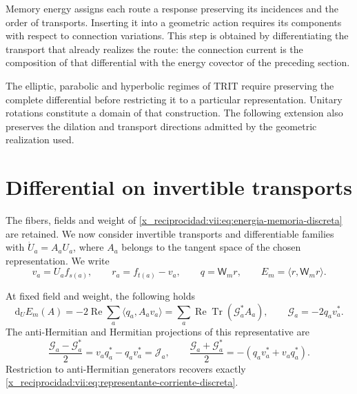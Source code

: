 Memory energy assigns each route a response preserving its
incidences and the order of transports. Inserting it into a geometric
action requires its components with respect to connection
variations. This step is obtained by differentiating the transport that already realizes
the route: the connection current is the composition of that differential
with the energy covector of the preceding section.

The elliptic, parabolic and hyperbolic regimes of TRIT require
preserving the complete differential before restricting it to a
particular representation. Unitary rotations constitute a
domain of that construction. The following extension also preserves
the dilation and transport directions admitted by the geometric
realization used.

\section{Differential on invertible transports}

The fibers, fields and weight of
\eqref{x_reciprocidad:vii:eq:energia-memoria-discreta} are retained. We now consider invertible
transports and differentiable families with
\(\dot U_a=A_aU_a\), where \(A_a\) belongs to the tangent space
of the chosen representation. We write
\[
 v_a=U_af_{s(a)},\qquad r_a=f_{t(a)}-v_a,\qquad
 q=\mathsf W_mr,\qquad E_m=\langle r,\mathsf W_mr\rangle.
\]

\begin{proposition}
\label{x_reciprocidad:vii:prop:diferencial-invertible}
At fixed field and weight, the following holds
\begin{equation}
 \mathrm d_UE_m(A)=-2\operatorname{Re}\sum_a
       \langle q_a,A_av_a\rangle
 =\sum_a\operatorname{Re}\operatorname{Tr}(\mathcal G_a^*A_a),
 \qquad \mathcal G_a=-2q_av_a^*.
 \label{x_reciprocidad:vii:eq:gradiente-transporte-completo}
\end{equation}
The anti-Hermitian and Hermitian projections of this representative are
\begin{equation}
 \frac{\mathcal G_a-\mathcal G_a^*}{2}
   =v_aq_a^*-q_av_a^*=\mathcal J_a,
 \qquad
 \frac{\mathcal G_a+\mathcal G_a^*}{2}
   =-(q_av_a^*+v_aq_a^*).
 \label{x_reciprocidad:vii:eq:proyecciones-gradiente-memoria}
\end{equation}
Restriction to anti-Hermitian generators recovers exactly
\eqref{x_reciprocidad:vii:eq:representante-corriente-discreta}.
\end{proposition}

